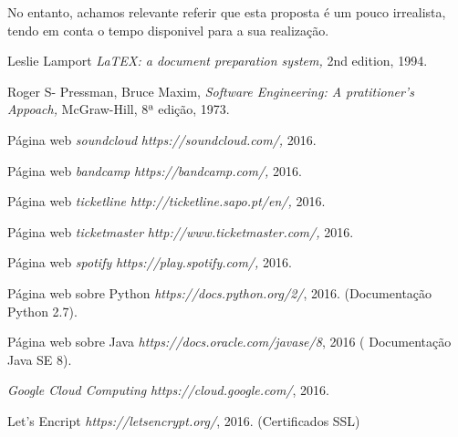 \documentclass[12pt, a4paper, twoside]{report} %
\begin{document}
\noindent No entanto, achamos relevante referir que esta proposta é um pouco irrealista, tendo em conta o tempo disponivel para a sua realização.


\begin{thebibliography}{1}

 Leslie Lamport {\em LaTEX: a document preparation system,}
  2nd edition, 1994.

 Roger S- Pressman, Bruce Maxim, {\em Software Engineering: A pratitioner's Appoach,} McGraw-Hill, 8ª edição, 1973.

 Página web \textit{soundcloud} {\em https://soundcloud.com/, } 2016.

 Página web \textit{bandcamp} {\em https://bandcamp.com/,} 2016.

 Página web \textit{ticketline} {\em http://ticketline.sapo.pt/en/,} 2016.

 Página web \textit{ticketmaster} {\em http://www.ticketmaster.com/,} 2016.

 Página web \textit{spotify} {\em https://play.spotify.com/,} 2016.

 Página web sobre Python {\em https://docs.python.org/2/}, 2016. (Documentação Python 2.7).

 Página web sobre Java {\em https://docs.oracle.com/javase/8}, 2016 ( Documentação Java SE 8).

 \textit{Google Cloud Computing} {\em https://cloud.google.com/}, 2016.

 Let's Encript {\em https://letsencrypt.org/}, 2016. (Certificados SSL)

\end{thebibliography}

\clearpage
\end{document}

